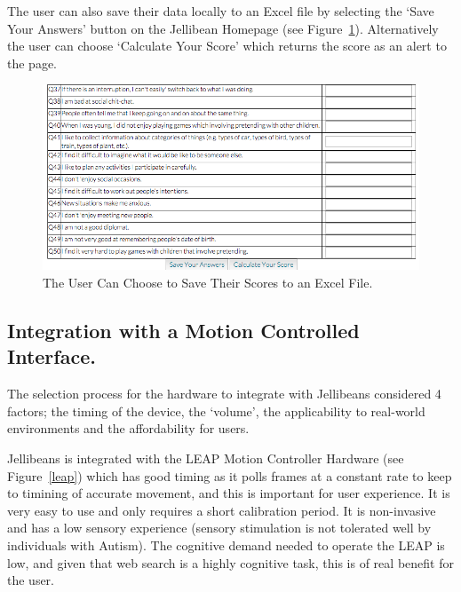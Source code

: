 \documentclass[a4paper, 11pt]{article}
\begin{document}
\vspace{5mm} 
The user can also save their data locally to an Excel file by selecting the `Save Your Answers' button on the Jellibean Homepage (see Figure~\ref{saveScores}). Alternatively the user can choose `Calculate Your Score' which returns the score as an alert to the page.


\begin{figure}[H]
\begin{center}
\includegraphics[scale=0.5]{saveScores}
\caption{The User Can Choose to Save Their Scores to an Excel File.}
\label{saveScores}
\end{center}
\end{figure}





\subsection{Integration with a Motion Controlled Interface.}

The selection process for the hardware to integrate with Jellibeans considered 4 factors; the timing of the device, the `volume', the applicability to real-world environments and the affordability for users.

\vspace{5mm}
Jellibeans is integrated with the LEAP Motion Controller Hardware (see Figure~\ref{leap}) which has good timing as it polls frames at a constant rate to keep to timining of accurate movement, and this is important for user experience. It is very easy to use and only requires a short calibration period. It is non-invasive and has a low sensory experience (sensory stimulation is not tolerated well by individuals with Autism). The cognitive demand needed to operate the LEAP is low, and given that web search is a highly cognitive task, this is of real benefit for the user.
\end{document}
